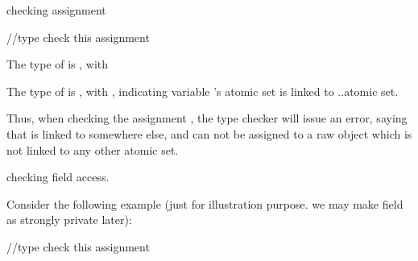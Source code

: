 \documentclass{article}
\begin{document}
\begin{enumerate}

\Item checking assignment


\hspace{3mm}

\hspace{6mm}

\hspace{6mm}

\hspace{6mm} //type check this assignment

\hspace{3mm} \CodeIn{\}}

\CodeIn{\}}



The type of  is , with 

The type of  is , with , indicating variable 's atomic set is linked to ..atomic set.

Thus, when checking the assignment , the type checker will issue an error, saying that  is linked to somewhere else, and can not be assigned to a raw object  which is not linked to any other atomic set.

\Item checking field access.

Consider the following example (just for illustration purpose. we may make field as strongly private later):


\hspace{3mm}

\CodeIn{\}}


\hspace{3mm}

\hspace{6mm}

\hspace{6mm} //type check this assignment

\hspace{3mm} \CodeIn{\}}


\end{enumerate}
\end{document}
